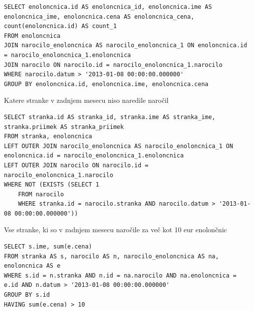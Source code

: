 \documentclass[12pt]{article}
\begin{document}
\begin{verbatim}
SELECT enoloncnica.id AS enoloncnica_id, enoloncnica.ime AS enoloncnica_ime, enoloncnica.cena AS enoloncnica_cena, count(enoloncnica.id) AS count_1 
FROM enoloncnica
JOIN narocilo_enoloncnica AS narocilo_enoloncnica_1 ON enoloncnica.id = narocilo_enoloncnica_1.enoloncnica
JOIN narocilo ON narocilo.id = narocilo_enoloncnica_1.narocilo 
WHERE narocilo.datum > '2013-01-08 00:00:00.000000'
GROUP BY enoloncnica.id, enoloncnica.ime, enoloncnica.cena
\end{verbatim}

Katere stranke v zadnjem mesecu niso naredile naročil

\begin{verbatim}
SELECT stranka.id AS stranka_id, stranka.ime AS stranka_ime, stranka.priimek AS stranka_priimek 
FROM stranka, enoloncnica
LEFT OUTER JOIN narocilo_enoloncnica AS narocilo_enoloncnica_1 ON enoloncnica.id = narocilo_enoloncnica_1.enoloncnica
LEFT OUTER JOIN narocilo ON narocilo.id = narocilo_enoloncnica_1.narocilo 
WHERE NOT (EXISTS (SELECT 1 
    FROM narocilo 
    WHERE stranka.id = narocilo.stranka AND narocilo.datum > '2013-01-08 00:00:00.000000'))
\end{verbatim}

Vse stranke, ki so v zadnjem mesecu naročile za več kot 10 eur enolončnic

\begin{verbatim}
SELECT s.ime, sum(e.cena)
FROM stranka AS s, narocilo AS n, narocilo_enoloncnica AS na, enoloncnica AS e
WHERE s.id = n.stranka AND n.id = na.narocilo AND na.enoloncnica = e.id AND n.datum > '2013-01-08 00:00:00.000000'
GROUP BY s.id
HAVING sum(e.cena) > 10
\end{verbatim}
    
\end{document}
